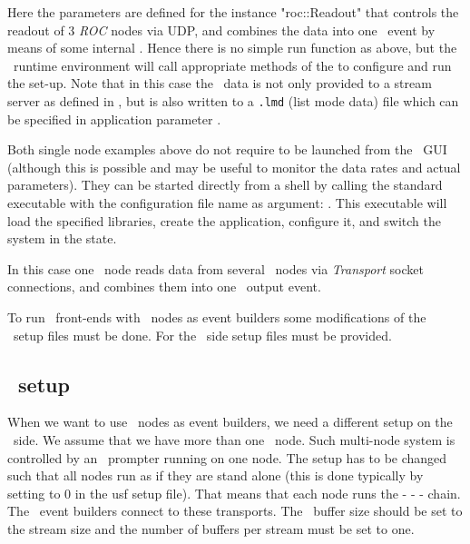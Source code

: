 Here the parameters are defined for the  instance
"roc::Readout" that controls  the readout of 3 {\em ROC} nodes via UDP, 
and combines the data into one \mbs\ event by means of some internal
. Hence there is no simple
run function as above, but the \dabc\ runtime environment will call
appropriate methods of the  to configure and run
the set-up. Note that in this case the \mbs\ data is not only provided to a
stream server as defined in , but is also
written to a {\tt *.lmd} (list mode data) file which can be specified
in application parameter .

Both single node examples above do not require to be launched from the \dabc\ GUI (although this is possible and may be useful to monitor the data rates and actual parameters).
They can be started directly from a shell 
by calling the standard 
executable with the configuration file name as argument:
. 
This executable will load the specified libraries,
create the application, configure it, and switch the system in 
the  state.   




In this case one \dabc\ node reads data from several
\mbs\ nodes via {\em Transport} socket connections, and combines them
into one \mbs\ output event. 


To run \mbs\ front-ends with \dabc\ nodes as event builders some
modifications of the \mbs\ setup files must be done.
For the \dabc\ side setup files must be provided.

\subsection[MBS setup]{\mbs\ setup}
When we want to use \dabc\ nodes as event builders, we need a different
setup on the \mbs\ side. We assume that we have more than one
\mbs\ node. Such multi-node system is controlled by an \mbs\ prompter running on one node.
The setup has to be changed such that all nodes run as if they are stand alone
(this is done typically by setting  to 0 in the usf setup file).
That means that each node runs the  -  - 
 - 
chain. The \dabc\ event builders connect to these transports.
The \mbs\ buffer size should be set to the stream size and the number of buffers per
stream must be set to one.

